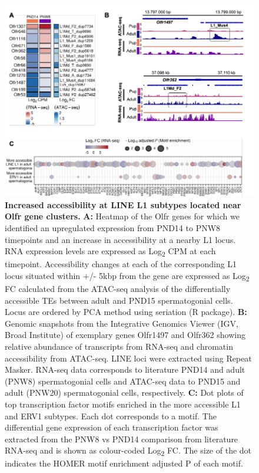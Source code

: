 \documentclass[12pt,twoside]{reedthesis}
\begin{document}
\begin{figure}[htbp]

{\centering \includegraphics{thesis_files/figure-latex/df6-1} 

}

\caption[Increased accessibility at LINE L1 subtypes located near Olfr gene clusters]{\textbf{Increased accessibility at LINE L1 subtypes located near Olfr gene clusters.} \newline \textbf{A:} Heatmap of the Olfr genes for which we identified an upregulated expression from PND14 to PNW8 timepoints and an increase in accessibility at a nearby L1 locus. RNA expression levels are expressed as Log\textsubscript{2} CPM at each timepoint. Accessibility changes at each of the corresponding L1 locus situated within +/- 5kbp from the gene are expressed as Log\textsubscript{2} FC calculated from the ATAC-seq analysis of the differentially accessible TEs between adult and PND15 spermatogonial cells. Locus are ordered by PCA method using seriation (R package). \newline \textbf{B:} Genomic snapshots from the Integrative Genomics Viewer (IGV, Broad Institute) of exemplary genes Olfr1497 and Olfr362 showing relative abundance of transcripts from RNA-seq and chromatin accessibility from ATAC-seq. LINE loci were extracted using Repeat Masker. RNA-seq data corresponds to literature PND14 and adult (PNW8) spermatogonial cells and ATAC-seq data to PND15 and adult (PNW20) spermatogonial cells, respectively. \newline \textbf{C:} Dot plots of top transcription factor motifs enriched in the more accessible L1 and ERV1 subtypes. Each dot corresponds to a motif. The differential gene expression of each transcription factor was extracted from the PNW8 vs PND14 comparison from literature RNA-seq and is shown as colour-coded Log\textsubscript{2} FC. The size of the dot indicates the HOMER motif enrichment adjusted P of each motif.}\label{fig:df6}
\end{figure}
\end{document}
